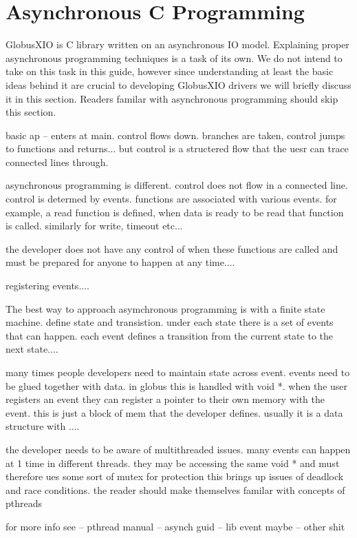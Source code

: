 \documentclass[11pt]{article}
\begin{document}
\section{Asynchronous C Programming}
GlobusXIO is C library written on an asynchronous IO model.  Explaining
proper asynchronous programming techniques is a task of its own.  We
do not intend to take on this task in this guide, however since 
understanding at least the basic ideas behind it are crucial to 
developing GlobusXIO drivers we will briefly discuss it in this section.
Readers familar with asynchronous programming should skip this section.

basic ap
--  enters at main.  control flows down.  branches are taken, control
    jumps to functions and returns...  but control is a structered flow 
    that the uesr can trace connected lines through.

asynchronous programming is different.  control does not flow in a connected
line.  control is determed by events.  functions are associated with various
events.  for example, a read function is defined, when data is ready to be 
read that function is called.  similarly for write, timeout etc...

the developer does not have any control of when these functions are called
and must be prepared for anyone to happen at any time.... 

registering events....

The best way to approach asymchronous programming is with a finite state
machine.  define state and transistion.  under each state there is 
a set of events that can happen.  each event defines a transition from
the current state to the next state....

many times people developers need to maintain state across event.  events
need to be glued together with data.  in globus this is handled with 
void *.  when the user registers an event they can register a pointer
to their own memory with the event.  this is just a block of mem that
the developer defines.  usually it is a data structure with ....

the developer needs to be aware of multithreaded issues.  many events
can happen at 1 time in different threads.  they may be accessing the
same void * and must therefore ues some sort of mutex for protection  this
brings up issues of deadlock and race conditions.  the reader should make
themselves familar with concepts of pthreads

for more info see
-- pthread manual
-- asynch guid
-- lib event maybe
-- other shit
\end{document}
